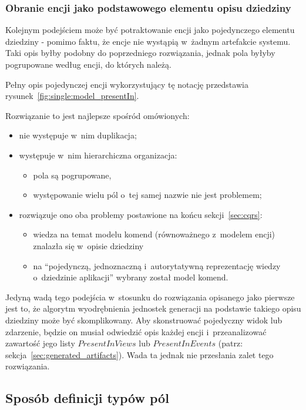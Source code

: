 \subsubsection{Obranie encji jako podstawowego elementu opisu dziedziny}

Kolejnym podejściem może być potraktowanie encji jako pojedynczego elementu dziedziny - pomimo faktu, że encje nie wystąpią w~żadnym artefakcie systemu.
Taki opis byłby podobny do poprzedniego rozwiązania, jednak pola byłyby pogrupowane według encji, do których należą.

Pełny opis pojedynczej encji wykorzystujący tę notację przedstawia rysunek~\ref{fig:single:model_presentIn}.



Rozwiązanie to jest najlepsze spośród omówionych:

\begin{itemize}
 \item nie występuje w~nim duplikacja;
 \item występuje w~nim hierarchiczna organizacja:
 \begin{itemize}
  \item pola są pogrupowane,
  \item występowanie wielu pól o~tej samej nazwie nie jest problemem;
 \end{itemize}
 \item rozwiązuje ono oba problemy postawione na końcu sekcji~\ref{sec:cqrs}:
  \begin{itemize}
   \item wiedza na temat modelu komend (równoważnego z~modelem encji) znalazła się w~opisie dziedziny
   \item na ``pojedynczą, jednoznaczną i~autorytatywną reprezentację wiedzy o~dziedzinie aplikacji'' wybrany został model komend.
  \end{itemize}
\end{itemize}

Jedyną wadą tego podejścia w~stosunku do rozwiązania opisanego jako pierwsze jest to, że algorytm wyodrębnienia jednostek generacji na podstawie takiego opisu dziedziny może być skomplikowany.
Aby skonstruować pojedyczny widok lub zdarzenie, będzie on musiał odwiedzić opis każdej encji i~przeanalizować zawartość jego listy $PresentInViews$ lub $PresentInEvents$ (patrz: sekcja~\ref{sec:generated_artifacts}).
Wada ta jednak nie przesłania zalet tego rozwiązania.


\subsection{Sposób definicji typów pól}

